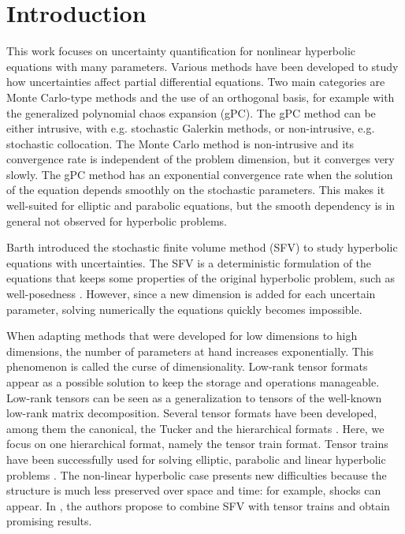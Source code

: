 \documentclass{article}
\begin{document}
\section{Introduction}
This work focuses on uncertainty quantification for nonlinear hyperbolic equations with many parameters. 
Various methods have been developed to study how uncertainties affect partial differential equations.
Two main categories are Monte Carlo-type methods and the use of an orthogonal basis, for example with the generalized polynomial chaos expansion (gPC). 
The gPC method can be either intrusive, with e.g. stochastic Galerkin methods, or non-intrusive, e.g. stochastic collocation. 
The Monte Carlo method is non-intrusive and its convergence rate is independent of the problem dimension, but it converges very slowly. 
The gPC method has an exponential convergence rate when the solution of the equation depends smoothly on the stochastic parameters.
This makes it well-suited for elliptic and parabolic equations, but the smooth dependency is in general not observed for hyperbolic problems. 

Barth \cite{barth_propagation_2012} introduced the stochastic finite volume method (SFV) to study hyperbolic equations with uncertainties. 
The SFV is a deterministic formulation of the equations that keeps some properties of the original hyperbolic problem, such as well-posedness \cite{mishra_sparse_2012}. 
However, since a new dimension is added for each uncertain parameter, solving numerically the equations quickly becomes impossible. 

When adapting methods that were developed for low dimensions to high dimensions, the number of parameters at hand increases exponentially. 
This phenomenon is called the curse of dimensionality. 
Low-rank tensor formats appear as a possible solution to keep the storage and operations manageable. 
Low-rank tensors can be seen as a generalization to tensors of the well-known low-rank matrix decomposition. 
Several tensor formats have been developed, among them the canonical, the Tucker and the hierarchical formats \cite{bachmayr_low-rank_2023}. 
Here,  we focus on one hierarchical format, namely the tensor train format. 
Tensor trains have been successfully used for solving elliptic, parabolic and linear hyperbolic problems \cite{oseledets_tensor-train_2011, kornev_numerical_2023, zhong_fast_2018}. 
The non-linear hyperbolic case presents new difficulties because the structure is much less preserved over space and time: for example, shocks can appear. 
In \cite{walton_tensor-train_2024}, the authors propose to combine SFV with tensor trains and obtain promising results. 
\end{document}
